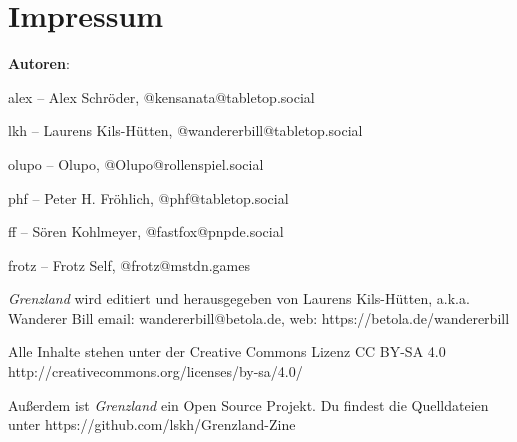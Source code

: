 \documentclass[11pt]{wbzine}
\begin{document}



\section{Impressum}

\textbf{Autoren}:

alex -- Alex Schröder, @kensanata@tabletop.social

lkh -- Laurens Kils-Hütten, @wandererbill@tabletop.social

olupo -- Olupo, @Olupo@rollenspiel.social

phf -- Peter H. Fröhlich, @phf@tabletop.social

ff -- Sören Kohlmeyer, @fastfox@pnpde.social

frotz -- Frotz Self, @frotz@mstdn.games

\textit{Grenzland} wird editiert und
herausgegeben von Laurens Kils-Hütten,
a.k.a. Wanderer Bill
email: wandererbill@betola.de, web: https://betola.de/wandererbill

Alle Inhalte stehen unter der Creative Commons Lizenz
CC BY-SA 4.0\\
http://creativecommons.org/licenses/by-sa/4.0/

Außerdem ist \textit{Grenzland} ein Open Source Projekt. Du
findest die Quelldateien unter
https://github.com/lskh/Grenzland-Zine

\newpage\thispagestyle{empty}\null

\end{document}
